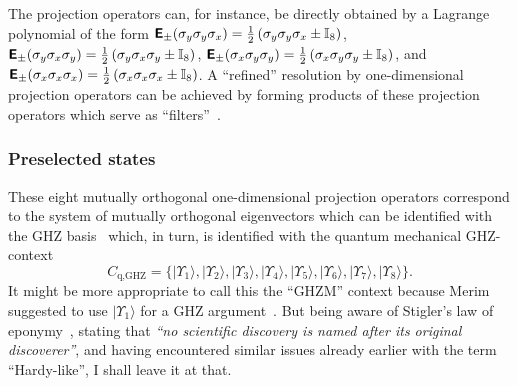 \documentclass[sn-mathphys]{sn-jnl}%
\theoremstyle{thmstyleone}%
\theoremstyle{thmstyletwo}%
\theoremstyle{thmstylethree}%
\begin{document}
The projection operators can, for instance, be directly obtained by a Lagrange polynomial of the form
$\textsf{\textbf{E}}_{\pm}  ( \sigma_y \sigma_y \sigma_x ) = \frac{1}{2}\left(\sigma_y \sigma_y \sigma_x \pm \mathbb{I}_8\right)$,
$\textsf{\textbf{E}}_{\pm}  ( \sigma_y \sigma_x \sigma_y ) = \frac{1}{2}\left(\sigma_y \sigma_x \sigma_y \pm \mathbb{I}_8\right)$,
$\textsf{\textbf{E}}_{\pm}  ( \sigma_x \sigma_y \sigma_y ) = \frac{1}{2}\left(\sigma_x \sigma_y \sigma_y \pm \mathbb{I}_8\right)$, and
$\textsf{\textbf{E}}_{\pm}  ( \sigma_x \sigma_x \sigma_x ) = \frac{1}{2}\left(\sigma_x \sigma_x \sigma_x \pm \mathbb{I}_8\right)$.
A ``refined'' resolution by one-dimensional projection operators can be achieved
by forming products of these projection operators which serve as ``filters''~\cite{DonSvo01}.

\subsubsection{Preselected states}
These eight mutually orthogonal one-dimensional projection operators correspond to the system of mutually orthogonal eigenvectors
which can be identified with the GHZ basis~\cite{mermin,krenn1,Uchida-2015} which, in turn, is identified with
the quantum mechanical GHZ-context
\begin{equation}
C_\text{q,GHZ}=\{
\vert \Upsilon_1 \rangle ,
\vert \Upsilon_2 \rangle ,
\vert \Upsilon_3 \rangle ,
\vert \Upsilon_4 \rangle ,
\vert \Upsilon_5 \rangle ,
\vert \Upsilon_6 \rangle ,
\vert \Upsilon_7 \rangle ,
\vert \Upsilon_8 \rangle
\}.
\label{2020-ghz-context}
\end{equation}
It might be more appropriate to call this the ``GHZM'' context because Merim suggested to use $\vert \Upsilon_1 \rangle$ for a GHZ argument~\cite{mermin}.
But being aware of Stigler's law of eponymy~\cite{Stigler1980,Stigler-sott}, stating that
{\it ``no scientific discovery is named after its original discoverer''},
and having encountered similar issues already earlier with the term ``Hardy-like'',
I shall leave it at that.
\end{document}
